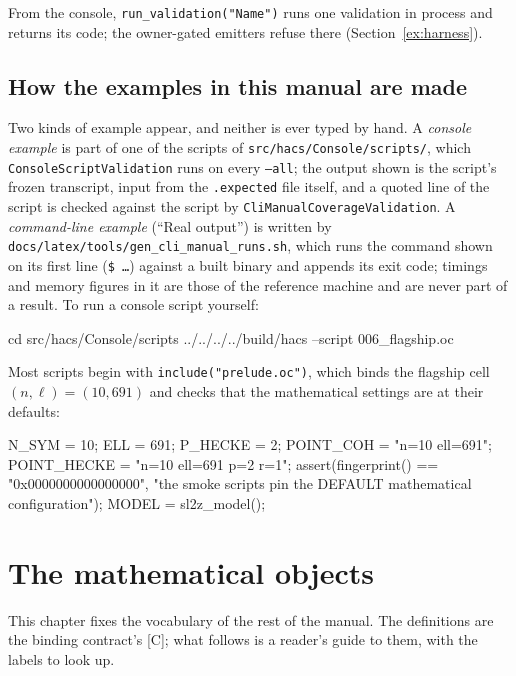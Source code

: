 \documentclass[11pt,openany]{report}
\newcommand{\cli}[1]{\texttt{#1}}
\newcommand{\file}[1]{\nolinkurl{#1}}
\newcommand{\vb}[1]{\texttt{#1}}
\newcommand{\excerptfrom}[1]{\par\smallskip\noindent{\small\textit{From} \nolinkurl{Console/scripts/#1}:}\par\nopagebreak}
\begin{document}
From the console, \vb{run\_validation("Name")} runs one validation in process and returns its code; the
owner-gated emitters refuse there (Section~\ref{ex:harness}).

\section{How the examples in this manual are made}\label{sec:examples}

Two kinds of example appear, and neither is ever typed by hand. A \emph{console example} is part of one of the scripts
of \file{src/hacs/Console/scripts/}, which \vb{ConsoleScriptValidation} runs on every \cli{--all};
the output shown is the script's frozen transcript, input from the \file{.expected} file itself, and a quoted line of the
script is checked against the script by \vb{CliManualCoverageValidation}. A \emph{command-line example} (``Real output'')
is written by \file{docs/latex/tools/gen_cli_manual_runs.sh}, which runs the command shown on its first line (\texttt{\$
\dots}) against a built binary and appends its exit code; timings and memory figures in it are those of the reference
machine and are never part of a result. To run a console script yourself:
\begin{shell}
cd src/hacs/Console/scripts
../../../../build/hacs --script 006_flagship.oc
\end{shell}
Most scripts begin with \texttt{include("prelude.oc")}, which binds the flagship cell $(n,\ell)=(10,691)$ and checks that
the mathematical settings are at their defaults:

\excerptfrom{prelude.oc}
\begin{ocexcerpt}
N_SYM = 10;
ELL = 691;
P_HECKE = 2;
POINT_COH = "n=10 ell=691";
POINT_HECKE = "n=10 ell=691 p=2 r=1";
assert(fingerprint() == "0x0000000000000000",
"the smoke scripts pin the DEFAULT mathematical configuration");
MODEL = sl2z_model();
\end{ocexcerpt}

\chapter{The mathematical objects}\label{ch:objects}

This chapter fixes the vocabulary of the rest of the manual. The definitions are the binding contract's [C]; what
follows is a reader's guide to them, with the labels to look up.
\end{document}
